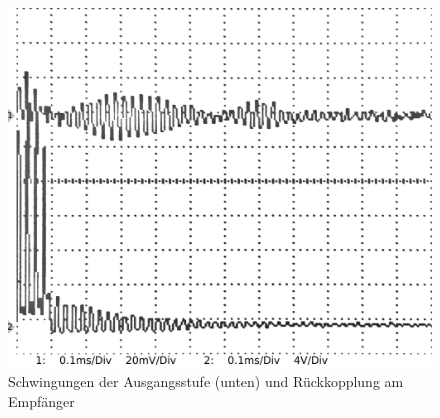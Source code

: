 \begin{figure}[H]
\centering
\includegraphics[width=(\textwidth), angle=0]{oszi/15-04-23/2_01.png}
\caption{Schwingungen der Ausgangsstufe (unten) und Rückkopplung am Empfänger} \label{img:I6}
\end{figure}


